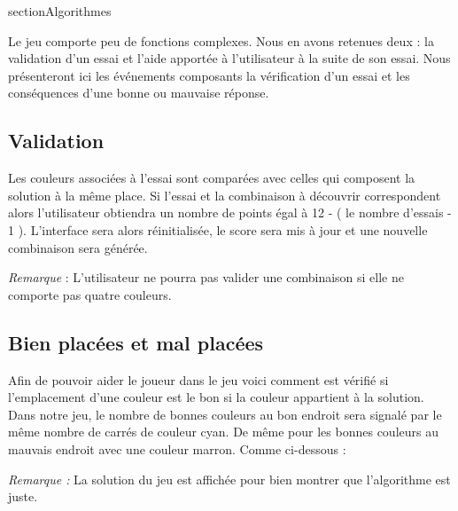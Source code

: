 \documentclass{article}
\begin{document}
section{Algorithmes}

Le jeu comporte peu de fonctions complexes. Nous en avons retenues deux : la validation d'un essai et l'aide apport\'{e}e \`{a} l'utilisateur \`{a} la suite de son essai. Nous pr\'{e}senteront ici les \'{e}v\'{e}nements composants la v\'{e}rification d'un essai et les cons\'{e}quences d'une bonne ou mauvaise r\'{e}ponse. 

\subsection{Validation}

\indent Les couleurs associ\'{e}es \`{a} l'essai sont compar\'{e}es avec celles qui composent la solution \`{a} la m\^{e}me place. Si l'essai et la combinaison \`{a} d\'{e}couvrir correspondent alors l'utilisateur obtiendra un nombre de points \'{e}gal \`{a} 12 - ( le nombre d'essais - 1 ). 
L'interface sera alors r\'{e}initialis\'{e}e, le score sera mis \`{a} jour et une nouvelle combinaison sera g\'{e}n\'{e}r\'{e}e.

\textit{Remarque} : L'utilisateur ne pourra pas valider une combinaison si elle ne comporte pas quatre couleurs.

\subsection{Bien plac\'{e}es et mal plac\'{e}es}
Afin de pouvoir aider le joueur dans le jeu voici comment est v\'{e}rifi\'{e} si l'emplacement d'une couleur est le bon si la couleur appartient \`{a} la solution. Dans notre jeu, le nombre de bonnes couleurs au bon endroit sera signal\'{e} par le m\^{e}me nombre de carr\'{e}s de couleur cyan. De m\^{e}me pour les bonnes couleurs au mauvais endroit avec une couleur marron.
Comme ci-dessous : 

\textit{Remarque : } La solution du jeu est affichée pour bien montrer que l'algorithme est juste.
\end{document}

